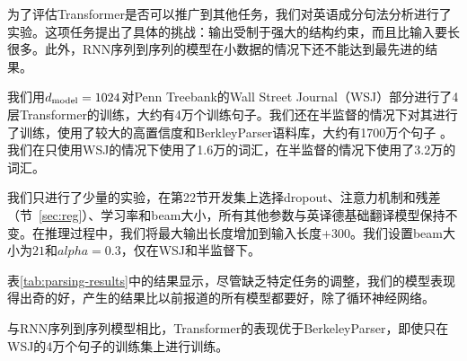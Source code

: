 为了评估Transformer是否可以推广到其他任务，我们对英语成分句法分析进行了实验。这项任务提出了具体的挑战：输出受制于强大的结构约束，而且比输入要长很多。此外，RNN序列到序列的模型在小数据的情况下还不能达到最先进的结果\cite{KVparse15}。


我们用$d_{\text{model}}=1024$对Penn Treebank的Wall Street Journal（WSJ）部分进行了4层Transformer的训练，大约有4万个训练句子。我们还在半监督的情况下对其进行了训练，使用了较大的高置信度和BerkleyParser语料库，大约有1700万个句子  \citep{KVparse15}。我们在只使用WSJ的情况下使用了1.6万的词汇，在半监督的情况下使用了3.2万的词汇。


我们只进行了少量的实验，在第22节开发集上选择dropout、注意力机制和残差（节~\ref{sec:reg}）、学习率和beam大小，所有其他参数与英译德基础翻译模型保持不变。在推理过程中，我们将最大输出长度增加到输入长度+$300$。我们设置beam大小为$21$和$alpha=0.3$，仅在WSJ和半监督下。


表\ref{tab:parsing-results}中的结果显示，尽管缺乏特定任务的调整，我们的模型表现得出奇的好，产生的结果比以前报道的所有模型都要好，除了循环神经网络\cite{dyer-rnng:16}。



与RNN序列到序列模型\citep{KVparse15}相比，Transformer的表现优于BerkeleyParser\cite{petrov-EtAl:2006:ACL}，即使只在WSJ的4万个句子的训练集上进行训练。
